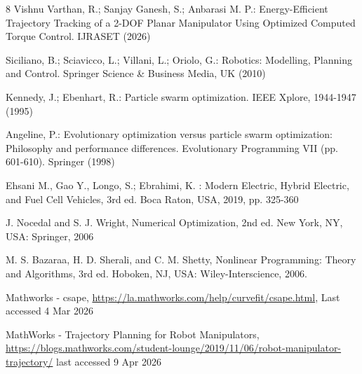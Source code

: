 \documentclass[runningheads]{llncs}
\begin{document}
\begin{thebibliography}{8}
Vishnu Varthan, R.; Sanjay Ganesh, S.; Anbarasi M. P.: Energy-Efficient Trajectory Tracking of a 2-DOF Planar Manipulator Using Optimized Computed Torque Control. IJRASET (2026)

Siciliano, B.; Sciavicco, L.; Villani, L.; Oriolo, G.: Robotics: Modelling, Planning and Control. Springer Science \& Business Media, UK (2010)

Kennedy, J.; Ebenhart, R.: Particle swarm optimization. IEEE Xplore, 1944-1947 (1995)

Angeline, P.: Evolutionary optimization versus particle swarm optimization: Philosophy and performance differences. Evolutionary Programming VII (pp. 601-610). Springer (1998)

Ehsani M., Gao Y., Longo, S.; Ebrahimi, K. : Modern Electric, Hybrid Electric, and Fuel Cell Vehicles, 3rd ed. Boca Raton, USA, 2019, pp. 325-360

J. Nocedal and S. J. Wright, Numerical Optimization, 2nd ed. New York, NY, USA: Springer, 2006

M. S. Bazaraa, H. D. Sherali, and C. M. Shetty, Nonlinear Programming: Theory and Algorithms, 3rd ed. Hoboken, NJ, USA: Wiley-Interscience, 2006.

Mathworks - csape, \url{https://la.mathworks.com/help/curvefit/csape.html}, Last accessed 4 Mar 2026

MathWorks - Trajectory Planning for Robot Manipulators, \url{https://blogs.mathworks.com/student-lounge/2019/11/06/robot-manipulator-trajectory/} last accessed 9 Apr 2026

\end{thebibliography}
\end{document}
